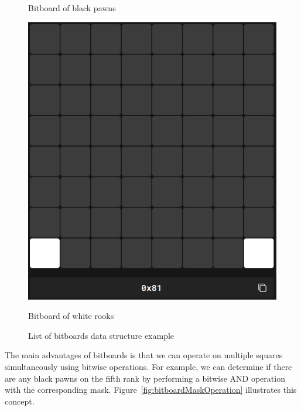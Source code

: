 \begin{figure}[H]
\begin{minipage}[c]{0.30\textwidth}
        \caption*{Bitboard of black pawns}
    \end{minipage}
    \hfill
    \begin{minipage}[c]{0.30\textwidth}
        \includegraphics[width=\textwidth]{Imagenes/bitboard_white_rooks.png}
        \caption*{Bitboard of white rooks}
    \end{minipage}
    \caption{List of bitboards data structure example}
    \label{fig:bitboardPositionExample}
\end{figure}

\newpage

\noindent The main advantages of bitboards is that we can operate on multiple squares simultaneously using bitwise operations. For example, we can determine if there are any black pawns on the fifth rank by performing a bitwise AND operation with the corresponding mask. Figure~\ref{fig:bitboardMaskOperation} illustrates this concept.

